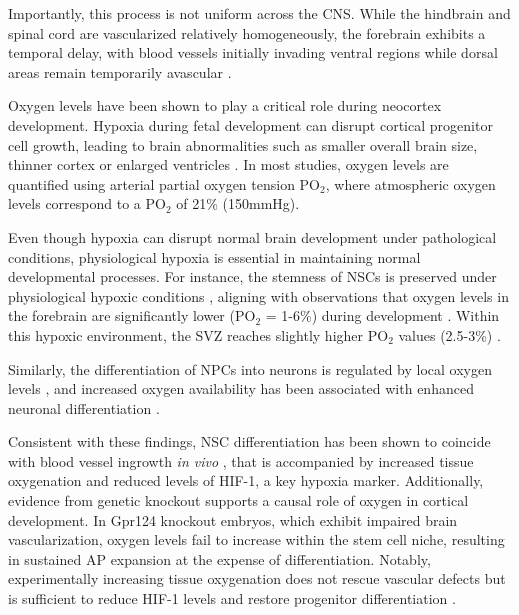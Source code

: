 Importantly, this process is not uniform across the CNS. While the hindbrain and spinal cord are vascularized relatively homogeneously, the forebrain exhibits a temporal delay, with blood vessels initially invading ventral regions while dorsal areas remain temporarily avascular \citep{VASUDEVANCompartmentspecificTranscriptionFactors2008}.

Oxygen levels have been shown to play a critical role during neocortex development. Hypoxia during fetal development can disrupt cortical progenitor cell growth, leading to brain abnormalities such as smaller overall brain size, thinner cortex or enlarged ventricles \citep{piesovaImpactPerinatalHypoxia2020}.
In most studies, oxygen levels are quantified using  arterial partial oxygen tension PO$_2$, where atmospheric oxygen levels correspond to a PO$_2$ of 21\% (150mmHg).


Even though hypoxia can disrupt normal brain development under pathological conditions, physiological hypoxia is essential in maintaining normal developmental processes. For instance, the stemness of NSCs is preserved under physiological hypoxic conditions \citep{EZASHILowO2Tensions2005}, aligning with observations that oxygen levels in the forebrain are significantly lower (PO$_2$ = 1-6\%) during development \citep{LEEDeterminationHypoxicRegion2001,ZHANGOxygenKeyFactor2011}. Within this hypoxic environment, the SVZ reaches slightly higher PO$_2$ values (2.5-3\%) \citep{SANTILLIMildHypoxiaEnhances2010}.


Similarly, the differentiation of NPCs into neurons is regulated by local oxygen levels \citep{malikNeurogenesisContinuesThird2013},  and increased oxygen availability has been associated with enhanced neuronal differentiation \citep{STORCHFunctionalCharacterizationDopaminergic2003,SASANTILLIMildHypoxiaEnhances2010,STUDEREnhancedProliferationSurvival2000}.


Consistent with these findings, NSC differentiation has been shown to coincide with blood vessel ingrowth \textit{in vivo} \citep{SHENEndothelialCellsStimulate2004}, that is accompanied by increased tissue oxygenation and reduced levels of HIF-1\textalpha, 
a key hypoxia marker. Additionally, evidence from genetic knockout supports a causal role of oxygen in cortical development. In Gpr124 knockout embryos, which exhibit impaired brain vascularization, oxygen levels fail to increase within the stem cell niche, resulting in sustained AP expansion at the expense of differentiation. Notably, experimentally increasing tissue oxygenation does not rescue vascular defects but is sufficient to reduce HIF-1\textalpha 
levels and restore progenitor differentiation \citep{LANGEReliefHypoxiaAngiogenesis2016}.

